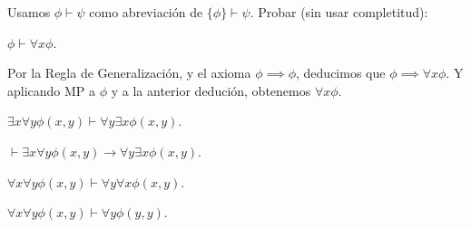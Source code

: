 \begin{problem}  Usamos $\phi \vdash \psi$ como abreviaci\'on de  $\{\phi\} \vdash \psi$.  Probar (sin usar completitud):

\ppart $ \phi  \vdash   \forall x \phi$.

Por la Regla de Generalización, y el axioma $\phi \implies \phi$, deducimos que $\phi \implies \forall x \phi$. Y aplicando MP a $\phi$ y a la anterior dedución, obtenemos $\forall x \phi$.

\ppart  $\exists x \forall y \phi (x,y)  \vdash   \forall y \exists x \phi (x,y)$.

\ppart  $ \vdash  \exists x \forall y \phi (x,y)  \to \forall y \exists x \phi (x,y)$.

\ppart   $  \forall x \forall y \phi (x,y) \vdash   \forall y \forall x \phi (x,y)$.

\ppart   $  \forall x \forall y \phi (x,y) \vdash   \forall y \phi (y,y)$.

\solution

\end{problem}